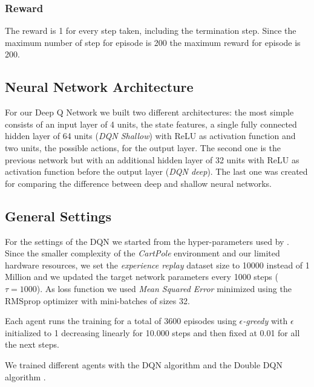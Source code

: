 \subsubsection{Reward}
The reward is 1 for every step taken, including the termination step. Since the maximum number of step for episode is 200 the maximum reward for episode is 200.


\subsection{Neural Network Architecture}

For our Deep Q Network we built two different architectures: the most simple consists of an input layer of 4 units, the state features, a single fully connected hidden layer of 64 units (\textit{DQN Shallow}) with ReLU as activation function and two units, the possible actions, for the output layer. The second one is the previous network but with an additional hidden layer of 32 units with ReLU as activation function before the output layer (\textit{DQN deep}). %
The last one was created for comparing the difference between deep and shallow neural networks.

\subsection{General Settings}

For the settings of the DQN we started from the hyper-parameters used by \citeauthor{Hasselt:2016:DRL:3016100.3016191} . Since the smaller complexity of the \textit{CartPole} environment and our limited hardware resources, we set the \textit{experience replay} dataset size  to 10000 instead of 1 Million and we updated the target network parameters every 1000 steps ($\tau = 1000$). As loss function we used \textit{Mean Squared Error} minimized using the RMSprop optimizer with mini-batches of sizes 32.

Each agent runs the training for a total of 3600 episodes using \textit{$\epsilon$-greedy} with $\epsilon$ initialized to 1 decreasing linearly for 10.000 steps and then fixed at 0.01 for all the next steps.

We trained different agents with the DQN algorithm \cite{Mnih2015} and the Double DQN algorithm \cite{Hasselt:2016:DRL:3016100.3016191}.

